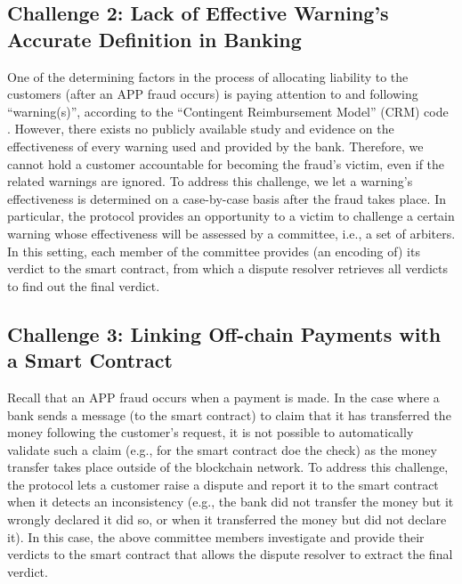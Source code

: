 \subsection{Challenge 2: Lack of Effective Warning's Accurate Definition in Banking}

One of the determining  factors in the process of allocating liability to the customers (after an APP fraud occurs) is paying attention to and following ``warning(s)'', according to the ``Contingent Reimbursement Model'' (CRM) code \cite{CRM-code}. However, there exists  no  publicly available study and evidence on the  effectiveness of every warning used and provided by the bank. Therefore, we cannot hold a customer accountable for becoming the fraud's victim,  even if the related warnings are ignored.    To address this challenge, we let a warning's effectiveness is determined on a case-by-case basis after the fraud takes place. In particular, the protocol provides an opportunity to a victim to  challenge a certain warning whose effectiveness will be assessed by a committee, i.e., a set of arbiters. In this setting, each member of the  committee provides (an encoding of) its verdict to the smart contract, from which a dispute resolver retrieves all verdicts to find out the final verdict. %






\subsection{Challenge 3: Linking Off-chain Payments with a Smart Contract}\label{sec::Linking Off-chain-Payments-with-contract}
 Recall that an APP fraud occurs when a payment is made. In the case where a  bank  sends a message (to the smart contract) to  claim  that it has transferred the money following the customer's request, it is not possible to automatically validate such a claim (e.g.,  for the smart contract doe the  check) as the money  transfer takes place  outside of the blockchain network. To address this challenge, the protocol lets a customer raise a dispute and report it to the smart contract when it detects an inconsistency (e.g., the bank did not transfer the money but it wrongly declared it did so, or when it transferred the money but did not declare it). In this case, the above committee members investigate and provide their  verdicts to the smart contract that allows the dispute resolver to extract the final verdict. 




